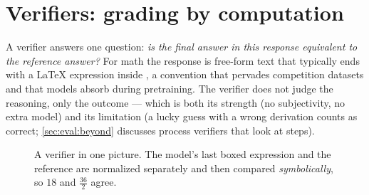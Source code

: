 \section{Verifiers: grading by computation}\label{sec:eval:verifiers}


A verifier answers one question: \emph{is the final answer in this response equivalent to the
reference answer?} For math the response is free-form text that typically ends with a
\LaTeX{} expression inside \bx{}, a convention that pervades competition datasets and that
models absorb during pretraining. The verifier does not judge the reasoning, only the
outcome --- which is both its strength (no subjectivity, no extra model) and its limitation (a
lucky guess with a wrong derivation counts as correct; \cref{sec:eval:beyond} discusses process
verifiers that look at steps).

\begin{figure}[t]
\centering
{}
\caption{A verifier in one picture. The model's last boxed expression and the reference are
normalized separately and then compared \emph{symbolically}, so $18$ and $\frac{36}{2}$ agree.}
\label{fig:eval:verifier}
\end{figure}

